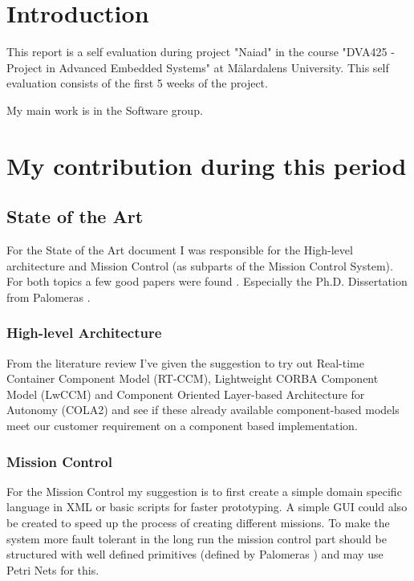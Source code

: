 \section{Introduction}
This report is a self evaluation during project "Naiad" in the course
"DVA425 - Project in Advanced Embedded Systems" at M\"{a}lardalens University.
This self evaluation consists of the first 5 weeks of the project.

My main work is in the Software group.

\section{My contribution during this period}
\subsection{State of the Art}
For the State of the Art document I was responsible for the High-level
architecture and Mission Control (as subparts of the Mission Control System).
For both topics a few good papers were found
\cite{palomeras2012,palomeras2011,martinez2008,martinez2013}.
Especially the Ph.D. Dissertation from Palomeras \cite{palomeras2011}.

\subsubsection{High-level Architecture}
From the literature review I've given the suggestion to try out
Real-time Container Component Model (RT-CCM),
Lightweight CORBA Component Model (LwCCM) and
Component Oriented Layer-based Architecture for Autonomy (COLA2) and see if
these already available component-based models meet our
customer requirement on a component based implementation.

\subsubsection{Mission Control}
For the Mission Control my suggestion is to first create a simple domain
specific language in XML or basic scripts for faster prototyping. A simple
GUI could also be created to speed up the process of creating different missions.
To make the system more fault tolerant in the long run the mission control part
should be structured with well defined primitives (defined by Palomeras
\cite{palomeras2011}) and may use Petri Nets for this.

